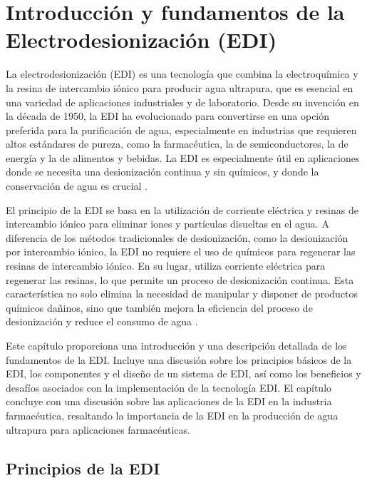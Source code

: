 \chapter{Introducción y fundamentos de la Electrodesionización (EDI)}\label{cap:fundamentosEDI}

La electrodesionización (EDI) es una tecnología que combina la electroquímica y la resina de intercambio iónico
para producir agua ultrapura, que es esencial en una variedad de aplicaciones industriales y de laboratorio.
Desde su invención en la década de 1950, la EDI ha evolucionado para convertirse en una opción preferida para
la purificación de agua, especialmente en industrias que requieren altos estándares de pureza, como la farmacéutica,
la de semiconductores, la de energía y la de alimentos y bebidas. La EDI es especialmente útil en aplicaciones donde se
necesita una desionización continua y sin químicos, y donde la conservación de agua es crucial \cite{alvaradoElectrodeionizationPrinciplesStrategies2014}.

El principio de la EDI se basa en la utilización de corriente eléctrica y resinas de intercambio iónico
para eliminar iones y partículas disueltas en el agua. A diferencia de los métodos tradicionales de desionización,
como la desionización por intercambio iónico, la EDI no requiere el uso de químicos para regenerar las resinas de
intercambio iónico. En su lugar, utiliza corriente eléctrica para regenerar las resinas, lo que permite un proceso
de desionización continua. Esta característica no solo elimina la necesidad de manipular y disponer de productos
químicos dañinos, sino que también mejora la eficiencia del proceso de desionización y reduce el consumo de agua \cite{condorchemUltrapureWaterElectrodeionization2019}.

Este capítulo proporciona una introducción y una descripción detallada de los fundamentos de la EDI. Incluye una
discusión sobre los principios básicos de la EDI, los componentes y el diseño de un sistema de EDI, así como los
beneficios y desafíos asociados con la implementación de la tecnología EDI. El capítulo concluye con una discusión
sobre las aplicaciones de la EDI en la industria farmacéutica, resaltando la importancia de la EDI en la producción
de agua ultrapura para aplicaciones farmacéuticas.

\section{Principios de la EDI}

